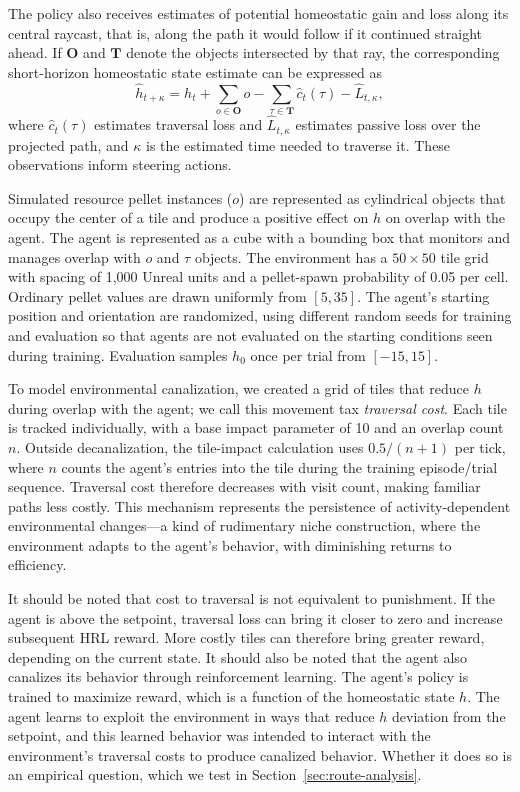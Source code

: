 \documentclass[12pt,fleqn]{article}
\begin{document}
The policy also receives estimates of potential homeostatic gain and loss along its central raycast, that is, along the path it would follow if it continued straight ahead. If $\mathbf{O}$ and $\mathbf{T}$ denote the objects intersected by that ray, the corresponding short-horizon homeostatic state estimate can be expressed as
\begin{equation}\label{eq:h-hat}
  \hat h_{t+\kappa}=h_t+\sum_{o\in\mathbf{O}}o-\sum_{\tau\in\mathbf{T}}\hat c_t(\tau)-\hat L_{t,\kappa},
\end{equation}
where $\hat c_t(\tau)$ estimates traversal loss and $\hat L_{t,\kappa}$ estimates passive loss over the projected path, and $\kappa$ is the estimated time needed to traverse it. These observations inform steering actions.

Simulated resource pellet instances (\(o\)) are represented as cylindrical objects that occupy the center of a tile and produce a positive effect on \(h\) on overlap with the agent. The agent is represented as a cube with a bounding box that monitors and manages overlap with \(o\) and \(\tau\) objects. The environment has a $50\times50$ tile grid with spacing of 1,000 Unreal units and a pellet-spawn probability of 0.05 per cell. Ordinary pellet values are drawn uniformly from $[5,35]$. The agent's starting position and orientation are randomized, using different random seeds for training and evaluation so that agents are not evaluated on the starting conditions seen during training. Evaluation samples $h_0$ once per trial from $[-15,15]$.

To model environmental canalization, we created a grid of tiles that reduce \(h\) during overlap with the agent; we call this movement tax \emph{traversal cost}. Each tile is tracked individually, with a base impact parameter of 10 and an overlap count \(n\). Outside decanalization, the tile-impact calculation uses \(0.5/(n+1)\) per tick, where \(n\) counts the agent's entries into the tile during the training episode/trial sequence. Traversal cost therefore decreases with visit count, making familiar paths less costly. This mechanism represents the persistence of activity-dependent environmental changes---a kind of rudimentary niche construction, where the environment adapts to the agent's behavior, with diminishing returns to efficiency.

It should be noted that cost to traversal is not equivalent to punishment. If the agent is above the setpoint, traversal loss can bring it closer to zero and increase subsequent HRL reward. More costly tiles can therefore bring greater reward, depending on the current state. It should also be noted that the agent also canalizes its behavior through reinforcement learning. The agent's policy is trained to maximize reward, which is a function of the homeostatic state \(h\). The agent learns to exploit the environment in ways that reduce \(h\) deviation from the setpoint, and this learned behavior was intended to interact with the environment's traversal costs to produce canalized behavior. Whether it does so is an empirical question, which we test in Section~\ref{sec:route-analysis}.
\end{document}
